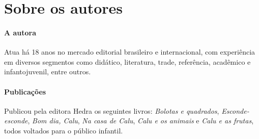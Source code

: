 \documentclass[11pt]{extarticle}
\begin{document}


\section{Sobre os autores}


\paragraph{A autora}
Atua há 18 anos no 
mercado editorial brasileiro e internacional, com experiência 
em diversos segmentos como didático, literatura, trade, 
referência, acadêmico e infantojuvenil, entre outros. 


\paragraph{Publicações}
Publicou pela editora Hedra os seguintes livros: \emph{Bolotas e quadrados},
\emph{Esconde-esconde}, \emph{Bom dia, Calu}, \emph{Na casa de Calu}, \emph{Calu e os animais} e
\emph{Calu e as frutas}, todos voltados para o público infantil.
\end{document}
